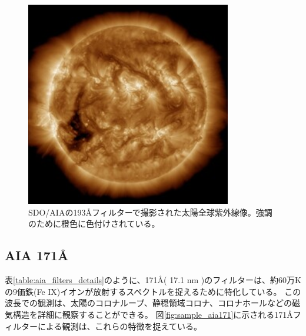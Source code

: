     \begin{figure}[h]
        \centering
        \includegraphics[width=0.8\textwidth]{figures/data/latest_256_0193.jpg}
        \caption{SDO/AIAの193Åフィルターで撮影された太陽全球紫外線像。強調のために橙色に色付けされている。}
        \label{fig:sample_aia193}
    \end{figure}
    
\subsection{AIA 171Å}
    表\ref{table:aia_filters_details}のように、171Å( 17.1 nm )のフィルターは、約60万Kの9価鉄(Fe IX)イオンが放射するスペクトルを捉えるために特化している。
    この波長での観測は、太陽のコロナループ、静穏領域コロナ、コロナホールなどの磁気構造を詳細に観察することができる。
    図\ref{fig:sample_aia171}に示される171Åフィルターによる観測は、これらの特徴を捉えている。
    
